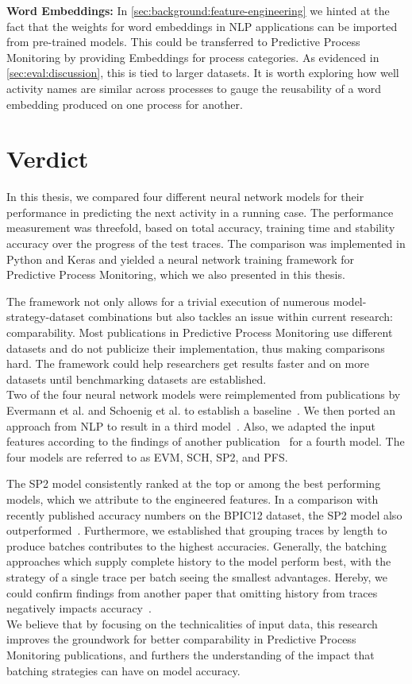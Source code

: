\noindent\textbf{Word Embeddings:} In \autoref{sec:background:feature-engineering} we hinted at the fact that the weights for word embeddings in NLP applications can be imported from pre-trained models. This could be transferred to Predictive Process Monitoring by providing Embeddings for process categories. As evidenced in \autoref{sec:eval:discussion}, this is tied to larger datasets. It is worth exploring how well activity names are similar across processes to gauge the reusability of a word embedding produced on one process for another.

\section{Verdict} \label{sec:conclusion:verdict}
In this thesis, we compared four different neural network models for their performance in predicting the next activity in a running case. The performance measurement was threefold, based on total accuracy, training time and stability accuracy over the progress of the test traces. The comparison was implemented in Python and Keras and yielded a neural network training framework for Predictive Process Monitoring, which we also presented in this thesis.

The framework not only allows for a trivial execution of numerous model-strategy-dataset combinations but also tackles an issue within current research: comparability. Most publications in Predictive Process Monitoring use different datasets and do not publicize their implementation, thus making comparisons hard. The framework could help researchers get results faster and on more datasets until benchmarking datasets are established.\\

Two of the four neural network models were reimplemented from publications by Evermann et al. and Schoenig et al. to establish a baseline~\cite{evermann2016, schoenig2018}. We then ported an approach from NLP to result in a third model~\cite{shibata2016bipartite}. Also, we adapted the input features according to the findings of another publication~\cite{klinkmuller2018reliablemonitoring} for a fourth model. The four models are referred to as EVM, SCH, SP2, and PFS.

The SP2 model consistently ranked at the top or among the best performing models, which we attribute to the engineered features. In a comparison with recently published accuracy numbers on the BPIC12 dataset, the SP2 model also outperformed~\cite{boehmer2018probability, evermann2016}. Furthermore, we established that grouping traces by length to produce batches contributes to the highest accuracies. Generally, the batching approaches which supply complete history to the model perform best, with the strategy of a single trace per batch seeing the smallest advantages. Hereby, we could confirm findings from another paper that omitting history from traces negatively impacts accuracy~\cite{klinkmuller2018reliablemonitoring}.\\

We believe that by focusing on the technicalities of input data, this research improves the groundwork for better comparability in Predictive Process Monitoring publications, and furthers the understanding of the impact that batching strategies can have on model accuracy.
